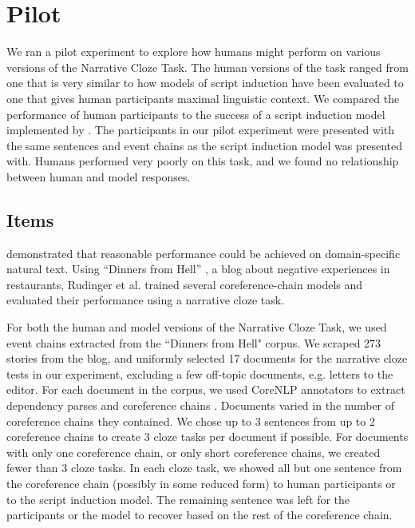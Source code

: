 \documentclass[10pt,a4paper]{article}
\newcommand{\todo}[1]{{\color{red}#1}}
\begin{document}

\section{Pilot}


We ran a pilot experiment to explore how humans might perform on various versions of the Narrative Cloze Task.
The human versions of the task ranged from one that is very similar to how models of script induction have been evaluated to one that gives human participants maximal linguistic context.
We compared the performance of human participants to the success of a script induction model implemented by .
The participants in our pilot experiment were presented with the same sentences and event chains as the script induction model was presented with.
Humans performed very poorly on this task, and we found no relationship between human and model responses.

\subsection{Items}

 demonstrated that reasonable performance could be achieved on domain-specific natural text.
Using ``Dinners from Hell'' \cite{dinnersfromhell}, a blog about negative experiences in restaurants, Rudinger et al. trained several coreference-chain models and evaluated their performance using a narrative cloze task.

For both the human and model versions of the Narrative Cloze Task, we used event chains extracted from the ``Dinners from Hell" corpus.
We scraped 273 stories from the blog, and uniformly selected 17 documents for the narrative cloze tests in our experiment, excluding a few off-topic documents, e.g. letters to the editor.
For each document in the corpus, we used CoreNLP annotators \cite{corenlp} to extract dependency parses \cite{depparse} and coreference chains \cite{coref2013a, coref2013b, coref2011, coref2010}.
Documents varied in the number of coreference chains they contained.
We chose up to 3 sentences from up to 2 coreference chains to create 3 cloze tasks per document if possible.
For documents with only one coreference chain, or only short coreference chains, we created fewer than 3 cloze tasks. 
In each cloze task, we showed all but one sentence from the coreference chain (possibly in some reduced form) to human participants or to the script induction model.
The remaining sentence was left for the participants or the model to recover based on the rest of the coreference chain.
\end{document}
